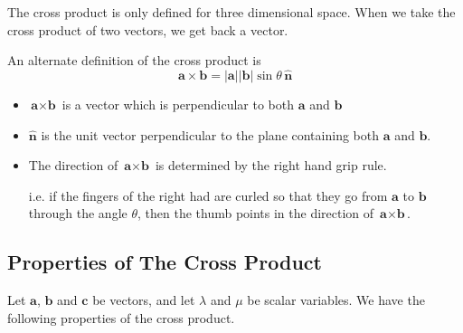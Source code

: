 \documentclass[11pt,a4paper]{book}
\begin{document}
The cross product is only defined for three dimensional space. When
we take the cross product of two vectors, we get back a vector.

An alternate definition of the cross product is
\[
\textbf{a}\times\textbf{b}=\left|\textbf{a}\right|\left|\textbf{b}\right|\sin\theta\,\hat{\textbf{n}}
\]

\begin{itemize}

\item $\textbf{a}\times\textbf{b}$ is a vector which is perpendicular
to both $\textbf{a}$ and $\textbf{b}$

\item $\hat{\textbf{n}}$ is the unit vector perpendicular to the
plane containing both $\textbf{a}$ and $\textbf{b}$.

\item The direction of $\textbf{a}\times\textbf{b}$ is determined
by the right hand grip rule.

i.e. if the fingers of the right had are curled so that they go from
$\textbf{a}$ to $\textbf{b}$ through the angle $\theta$, then the
thumb points in the direction of $\textbf{a}\times\textbf{b}$.

\end{itemize}

\subsection{Properties of The Cross Product}

Let $\textbf{a}$, $\textbf{b}$ and $\textbf{c}$ be vectors, and
let $\lambda$ and $\mu$ be scalar variables. We have the following
properties of the cross product.
\end{document}
